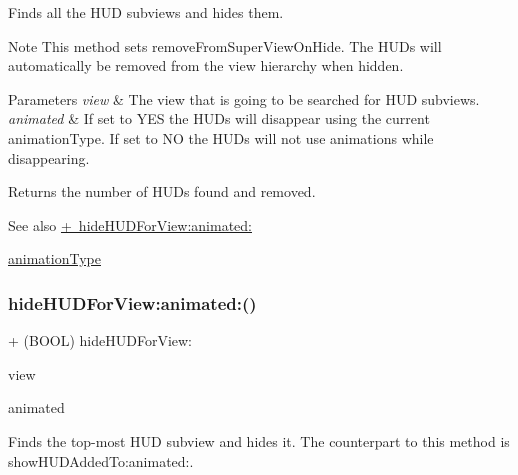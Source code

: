 Finds all the H\+UD subviews and hides them.

\begin{DoxyNote}{Note}
This method sets {\ttfamily remove\+From\+Super\+View\+On\+Hide}. The H\+U\+Ds will automatically be removed from the view hierarchy when hidden.
\end{DoxyNote}

\begin{DoxyParams}{Parameters}
{\em view} & The view that is going to be searched for H\+UD subviews. \\
\hline
{\em animated} & If set to Y\+ES the H\+U\+Ds will disappear using the current animation\+Type. If set to NO the H\+U\+Ds will not use animations while disappearing. \\
\hline
\end{DoxyParams}
\begin{DoxyReturn}{Returns}
the number of H\+U\+Ds found and removed.
\end{DoxyReturn}
\begin{DoxySeeAlso}{See also}
\mbox{\hyperlink{interface_m_b_progress_h_u_d_a7b0826c34eea1a15d62aabd00c249666}{+ hide\+H\+U\+D\+For\+View\+:animated\+:}} 

\mbox{\hyperlink{interface_m_b_progress_h_u_d_a71d04bb9e2839df9377ad10d03b2e468}{animation\+Type}} 
\end{DoxySeeAlso}
\mbox{\label{interface_m_b_progress_h_u_d_a7b0826c34eea1a15d62aabd00c249666}} 
\subsubsection{\texorpdfstring{hide\+H\+U\+D\+For\+View\+:animated\+:()}{hideHUDForView:animated:()}\hspace{0.1cm}{\footnotesize\ttfamily [1/3]}}
{\footnotesize\ttfamily + (B\+O\+OL) hide\+H\+U\+D\+For\+View\+: \begin{DoxyParamCaption}\item[{(U\+I\+View $\ast$)}]{view }\item[{animated:(B\+O\+OL)}]{animated }\end{DoxyParamCaption}}

Finds the top-\/most H\+UD subview and hides it. The counterpart to this method is show\+H\+U\+D\+Added\+To\+:animated\+:.

